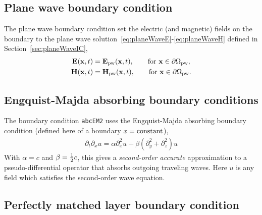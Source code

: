 \documentclass{article}
\begin{document}
\subsection{Plane wave boundary condition}\label{sec:planeWaveBoundaryCondition}

The plane wave boundary condition set the electric (and magnetic) fields on the boundary to the plane wave 
solution~\eqref{eq:planeWaveE}-\eqref{eq:planeWaveH} defined in Section~\ref{sec:planeWaveIC},
\begin{align}
   \mathbf{ E}(\mathbf{ x},t) &= \mathbf{ E}_{\rm pw}(\mathbf{ x},t), \qquad \text{for $\mathbf{ x} \in \partial\Omega_{\rm pw}$}, \\
   \mathbf{ H}(\mathbf{ x},t) &= \mathbf{ H}_{\rm pw}(\mathbf{ x},t), \qquad \text{for $\mathbf{ x} \in \partial\Omega_{\rm pw}$}. 
\end{align}

\subsection{Engquist-Majda absorbing boundary conditions}\label{sec:EngquistMajdaABC}


The boundary condition {\tt abcEM2} uses the Engquist-Majda absorbing boundary 
condition (defined here of a boundary $x={\rm constant}$), 
\begin{align}
   \partial_t\partial_x u = \alpha \partial_x^2 u + \beta (\partial_y^2+\partial_z^2) u 
\end{align}
With $\alpha=c$ and $\beta={1\over2} c$, this gives a {\em second-order accurate} approximation to 
a pseudo-differential operator that absorbs outgoing traveling waves. 
Here $u$ is any field which satisfies the second-order wave equation.

\subsection{Perfectly matched layer boundary condition}\label{sec:PML}
\end{document}
